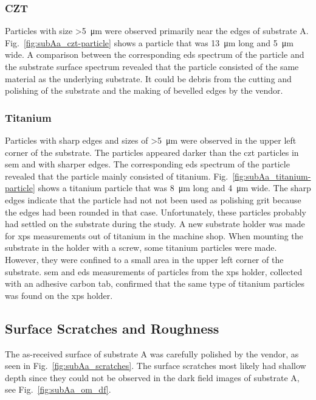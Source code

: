 \subsubsection{CZT}
Particles with size \SI{>5}{\micro\metre} were observed primarily near the edges of substrate A. Fig.~\ref{fig:subAa_czt-particle} shows a particle that was \SI{13}{\micro\metre} long and \SI{5}{\micro\metre} wide. A comparison between the corresponding \ac{eds} spectrum of the particle and the substrate surface spectrum revealed that the particle consisted of the same material as the underlying substrate. It could be debris from the cutting and polishing of the substrate and the making of bevelled edges by the vendor.


\subsubsection{Titanium}
Particles with sharp edges and sizes of \SI{>5}{\micro\metre} were observed in the upper left corner of the substrate. The particles appeared darker than the \ac{czt} particles in \ac{sem} and with sharper edges. The corresponding \ac{eds} spectrum of the particle revealed that the particle mainly consisted of titanium. Fig.~\ref{fig:subAa_titanium-particle} shows a titanium particle that was \SI{8}{\micro\metre} long and \SI{4}{\micro\metre} wide. The sharp edges indicate that the particle had not not been used as polishing grit because the edges had been rounded in that case. Unfortunately, these particles probably had settled on the substrate during the study. A new substrate holder was made for \ac{xps} measurements out of titanium in the machine shop. When mounting the substrate in the holder with a screw, some titanium particles were made. However, they were confined to a small area in the upper left corner of the substrate. \Ac{sem} and \ac{eds} measurements of particles from the \ac{xps} holder, collected with an adhesive carbon tab, confirmed that the same type of titanium particles was found on the \ac{xps} holder. %



\subsection{Surface Scratches and Roughness}
The as-received surface of substrate A was carefully polished by the vendor, as seen in Fig.~\ref{fig:subAa_scratches}. The surface scratches most likely had shallow depth since they could not be observed in the dark field images of substrate A, see Fig.~\ref{fig:subAa_om_df}.


